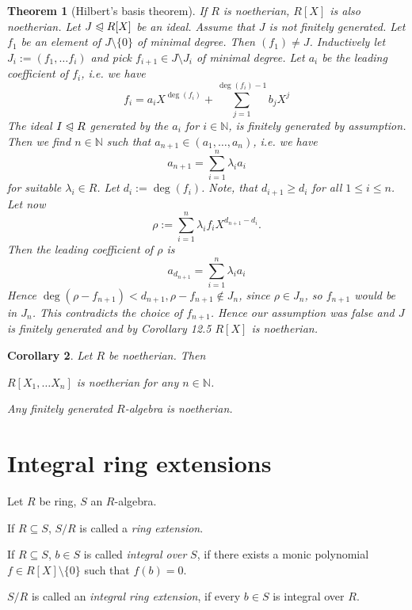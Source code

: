 \documentclass[11pt]{book}
\newtheorem{theorem}{Theorem}[section]
\newtheorem{corollary}[theorem]{Corollary}
\theoremstyle{nonumberbreak}
\newenvironment{defin}[1][]{\ifthenelse{\equal{#1}{}}{\definition}{\definition[#1]}\rm}{\enddefinition}
\newenvironment{pr}[1][]{\ifthenelse{\equal{#1}{}}{\proof}{\proof[#1]}\rm}{\endproof}
\begin{document}
\begin{spacing}{1.3}
\begin{theorem}[Hilbert's basis theorem]
If $R$ is noetherian, $R[X]$ is also noetherian.
\begin{pr}
Let $J \trianglelefteqslant R[X]$ be an ideal.
Assume that $J$ is not finitely generated.
Let $f_1$ be an element of $J \setminus \{0\}$ of minimal degree. Then $( f_1 ) \neq J$.
Inductively let $J_i:= ( f_1, \ldots f_i )$ and pick $f_{i+1} \in J \setminus J_{i}$ of minimal degree.
Let $a_i$ be the leading coefficient of $f_i$, i.e. we have
$$f_i = a_i X^{\deg(f_i)} + \sum_{j=1}^{\deg(f_i)-1} b_j X^{j}$$
The ideal $I \trianglelefteqslant R$ generated by the $a_i$ for $i \in \mathbb{N}$, is finitely generated by assumption.\\
Then we find $n \in \mathbb{N}$ such that $a_{n+1} \in ( a_1, \ldots, a_n )$, i.e. we have
$$a_{n+1}=\sum_{i=1}^n \lambda_i a_i$$
for suitable $\lambda_i \in R$. Let $d_i := \deg(f_i)$. Note, that $d_{i+1}\geqslant d_i$ for all $1 \leqslant i \leqslant n$.
Let now
$$\rho:= \sum_{i=1}^n \lambda_i f_i X^{d_{n+1}-d_i}.$$
Then the leading coefficient of $\rho$ is 
$$a_{d_{n+1}}=\sum_{i=1}^n \lambda_i a_i$$
Hence $\deg(\rho-f_{n+1}) < d_{n+1}, \rho-f_{n+1} \notin J_n$, since $\rho \in J_n$, so $f_{n+1}$ would be in $J_n$. This contradicts the choice of $f_{n+1}$.
Hence our assumption was false and $J$ is finitely generated and by Corollary 12.5 $R[X]$ is noetherian.
\end{pr}
\end{theorem}




\begin{corollary} %
Let $R$ be noetherian. Then 
\begin{compactenum}
\item $R[X_1, \ldots X_n]$ is noetherian for any $n \in \mathbb{N}$. 
\item Any finitely generated $R$-algebra is noetherian.
\end{compactenum}
\end{corollary}


\renewcommand*\thesection{§ \arabic{section}\quad }
\section{Integral ring extensions}
\renewcommand*\thesection{\arabic{section}}

\begin{defin} %
Let $R$ be ring, $S$ an $R$-algebra.
\begin{compactenum}
\item If $R\subseteq S$, $S/R$ is called a \textit{ring extension}.
\item If $R\subseteq S$, $b \in S$ is called \textit{integral over} $S$, if there exists a monic polynomial $f \in R[X]\setminus \{0\}$ such that $f(b)=0$.
\item $S/R$ is called an \textit{integral ring extension}, if every $b \in S$ is integral over $R$.
\end{compactenum}
\end{defin}


\end{spacing}
\end{document}
